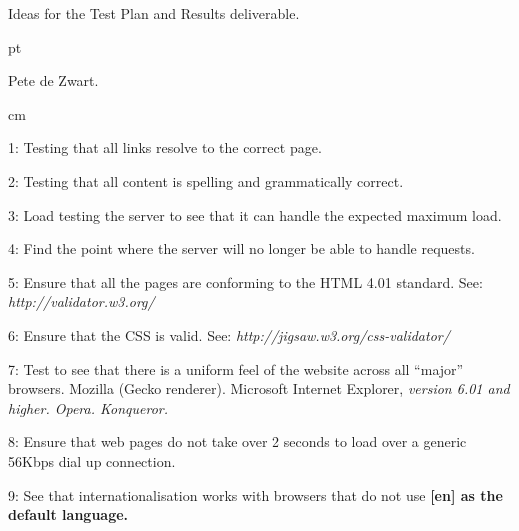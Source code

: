 
\centerline{Ideas for the Test Plan and Results deliverable.}
 pt
\centerline{Pete de Zwart.}
 cm

\item{1:} Testing that all links resolve to the correct page.
\item{2:} Testing that all content is spelling and grammatically correct.
\item{3:} Load testing the server to see that it can handle the expected maximum load.
\item{4:} Find the point where the server will no longer be able to handle requests.
\item{5:} Ensure that all the pages are conforming to the HTML 4.01 standard. See: \it http://validator.w3.org/ \rm
\item{6:} Ensure that the CSS is valid. See: \it http://jigsaw.w3.org/css-validator/ \rm
\item{7:} Test to see that there is a uniform feel of the website across all ``major'' browsers.
 Mozilla (Gecko renderer).
 Microsoft Internet Explorer, \it version 6.01 \rm and higher.
 Opera.
 Konqueror.
\item{8:} Ensure that web pages do not take over 2 seconds to load over a generic 56Kbps dial up connection.
\item{9:} See that internationalisation works with browsers that do not use \bf [en] \rm as the default language.

\bye
